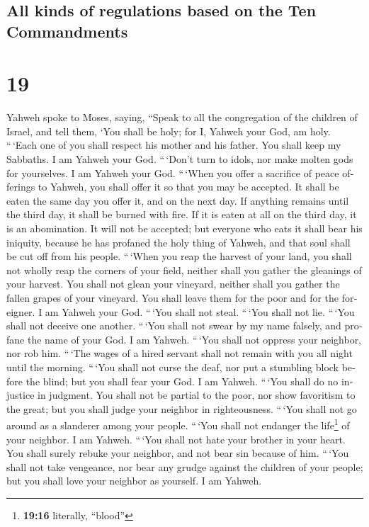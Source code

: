 \begin{paracol}{2}
\switchcolumn
\begin{otherlanguage}{english}

\hypertarget{all-kinds-of-regulations-based-on-the-ten-commandments}{%
\subsection{All kinds of regulations based on the Ten
Commandments}\label{all-kinds-of-regulations-based-on-the-ten-commandments}}

\hypertarget{section-37}{%
\section{19}\label{section-37}}

 Yahweh spoke to Moses, saying,  ``Speak to
all the congregation of the children of Israel, and tell them, `You
shall be holy; for I, Yahweh your God, am holy.  ``\,`Each
one of you shall respect his mother and his father. You shall keep my
Sabbaths. I am Yahweh your God.  ``\,`Don't turn to idols,
nor make molten gods for yourselves. I am Yahweh your God.
 ``\,`When you offer a sacrifice of peace offerings to
Yahweh, you shall offer it so that you may be accepted. 
It shall be eaten the same day you offer it, and on the next day. If
anything remains until the third day, it shall be burned with fire.
 If it is eaten at all on the third day, it is an
abomination. It will not be accepted;  but everyone who
eats it shall bear his iniquity, because he has profaned the holy thing
of Yahweh, and that soul shall be cut off from his people.
 ``\,`When you reap the harvest of your land, you shall
not wholly reap the corners of your field, neither shall you gather the
gleanings of your harvest.  You shall not glean your
vineyard, neither shall you gather the fallen grapes of your vineyard.
You shall leave them for the poor and for the foreigner. I am Yahweh
your God.  ``\,`You shall not steal. ``\,`You shall not
lie. ``\,`You shall not deceive one another.  ``\,`You
shall not swear by my name falsely, and profane the name of your God. I
am Yahweh.  ``\,`You shall not oppress your neighbor, nor
rob him. ``\,`The wages of a hired servant shall not remain with you all
night until the morning.  ``\,`You shall not curse the
deaf, nor put a stumbling block before the blind; but you shall fear
your God. I am Yahweh.  ``\,`You shall do no injustice in
judgment. You shall not be partial to the poor, nor show favoritism to
the great; but you shall judge your neighbor in righteousness.
 ``\,`You shall not go around as a slanderer among your
people. ``\,`You shall not endanger the life\footnote{\textbf{19:16}
  literally, ``blood''} of your neighbor. I am Yahweh. 
``\,`You shall not hate your brother in your heart. You shall surely
rebuke your neighbor, and not bear sin because of him. 
``\,`You shall not take vengeance, nor bear any grudge against the
children of your people; but you shall love your neighbor as yourself. I
am Yahweh.


\end{otherlanguage}
\end{paracol}
